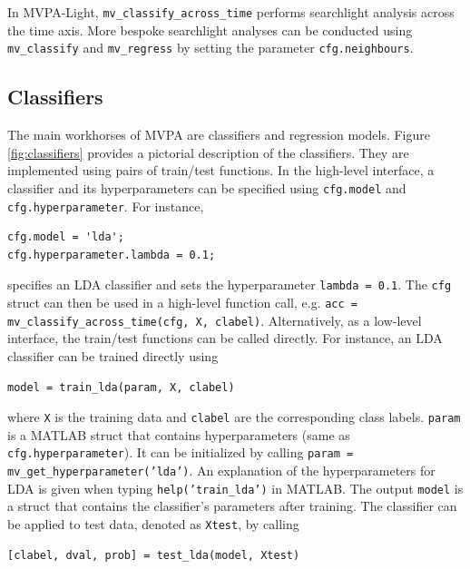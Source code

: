 \documentclass[utf8]{frontiersSCNS} %
\newcommand{\ttt}[1]{\texttt{#1}}
\begin{document}
In MVPA-Light, \ttt{mv\_classify\_across\_time} performs searchlight analysis across the time axis. More bespoke searchlight analyses can be conducted using \ttt{mv\_classify} and \ttt{mv\_regress} by setting the parameter \ttt{cfg.neighbours}.

\subsection{Classifiers}\label{sec:classifiers}

The main workhorses of MVPA are classifiers and regression models. Figure \ref{fig:classifiers} provides a pictorial description of the classifiers. They are implemented using pairs of train/test functions. In the high-level interface, a classifier and its hyperparameters can be specified using \ttt{cfg.model} and \ttt{cfg.hyperparameter}. For instance,

\begin{verbatim}
cfg.model = 'lda';
cfg.hyperparameter.lambda = 0.1;
\end{verbatim}

specifies an LDA classifier and sets the hyperparameter \ttt{lambda = 0.1}. The \ttt{cfg} struct can then be used in a high-level function call, e.g. \ttt{acc = mv\_classify\_across\_time(cfg, X, clabel)}.
Alternatively, as a low-level interface, the train/test functions can be called directly. For instance, an LDA classifier can be trained directly using

\begin{verbatim}
model = train_lda(param, X, clabel)
\end{verbatim}

where \ttt{X} is the training data and \ttt{clabel} are the corresponding class labels. \ttt{param} is a MATLAB struct that contains hyperparameters (same as \ttt{cfg.hyperparameter}). It can be initialized by calling \ttt{param = mv\_get\_hyperparameter('lda')}. An explanation of the hyperparameters for LDA is given when typing \ttt{help('train\_lda')} in MATLAB. 
The output \ttt{model} is a struct that contains the classifier's parameters after training. The classifier can be applied to test data, denoted as \ttt{Xtest}, by calling

\begin{verbatim}
[clabel, dval, prob] = test_lda(model, Xtest)
\end{verbatim}
\end{document}
